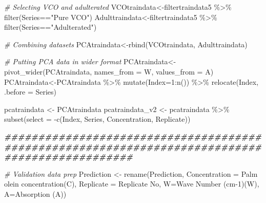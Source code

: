 \documentclass[
]{article}
\newenvironment{Shaded}{\begin{snugshade}}{\end{snugshade}}
\newcommand{\AttributeTok}[1]{\textcolor[rgb]{0.77,0.63,0.00}{#1}}
\newcommand{\CommentTok}[1]{\textcolor[rgb]{0.56,0.35,0.01}{\textit{#1}}}
\newcommand{\DecValTok}[1]{\textcolor[rgb]{0.00,0.00,0.81}{#1}}
\newcommand{\DocumentationTok}[1]{\textcolor[rgb]{0.56,0.35,0.01}{\textbf{\textit{#1}}}}
\newcommand{\FunctionTok}[1]{\textcolor[rgb]{0.00,0.00,0.00}{#1}}
\newcommand{\NormalTok}[1]{#1}
\newcommand{\OtherTok}[1]{\textcolor[rgb]{0.56,0.35,0.01}{#1}}
\newcommand{\SpecialCharTok}[1]{\textcolor[rgb]{0.00,0.00,0.00}{#1}}
\newcommand{\StringTok}[1]{\textcolor[rgb]{0.31,0.60,0.02}{#1}}
\begin{document}
\begin{Shaded}
\begin{Highlighting}[]
  \CommentTok{\# Selecting VCO and adulterated}
\NormalTok{  VCOtraindata}\OtherTok{\textless{}{-}}\NormalTok{filtertraindata5 }\SpecialCharTok{\%\textgreater{}\%} \FunctionTok{filter}\NormalTok{(Series}\SpecialCharTok{==}\StringTok{"Pure VCO"}\NormalTok{)}
\NormalTok{  Adulttraindata}\OtherTok{\textless{}{-}}\NormalTok{filtertraindata5 }\SpecialCharTok{\%\textgreater{}\%} \FunctionTok{filter}\NormalTok{(Series}\SpecialCharTok{==}\StringTok{"Adulterated"}\NormalTok{)}
  
  \CommentTok{\# Combining datasets}
\NormalTok{  PCAtraindata}\OtherTok{\textless{}{-}}\FunctionTok{rbind}\NormalTok{(VCOtraindata, Adulttraindata)}
  
  \CommentTok{\# Putting PCA data in wider format}
\NormalTok{  PCAtraindata}\OtherTok{\textless{}{-}}\FunctionTok{pivot\_wider}\NormalTok{(PCAtraindata, }\AttributeTok{names\_from =}\NormalTok{ W, }\AttributeTok{values\_from =}\NormalTok{ A)}
\NormalTok{  PCAtraindata}\OtherTok{\textless{}{-}}\NormalTok{PCAtraindata }\SpecialCharTok{\%\textgreater{}\%} \FunctionTok{mutate}\NormalTok{(}\AttributeTok{Index=}\DecValTok{1}\SpecialCharTok{:}\FunctionTok{n}\NormalTok{()) }\SpecialCharTok{\%\textgreater{}\%} \FunctionTok{relocate}\NormalTok{(Index, }\AttributeTok{.before =}\NormalTok{ Series)}
  
\NormalTok{  pcatraindata }\OtherTok{\textless{}{-}}\NormalTok{  PCAtraindata}
\NormalTok{  pcatraindata\_v2 }\OtherTok{\textless{}{-}}\NormalTok{ pcatraindata }\SpecialCharTok{\%\textgreater{}\%} \FunctionTok{subset}\NormalTok{(}\AttributeTok{select =} \SpecialCharTok{{-}}\FunctionTok{c}\NormalTok{(Index, Series, Concentration, Replicate))}

 \DocumentationTok{\#\#\#\#\#\#\#\#\#\#\#\#\#\#\#\#\#\#\#\#\#\#\#\#\#\#\#\#\#\#\#\#\#\#\#\#\#\#\#\#\#\#\#\#\#\#\#\#\#\#\#\#\#\#\#\#\#\#\#\#\#\#\#\#\#\#\#\#\#\#\#\#\#\#\#\#\#\#\#\#\#\#\#\#\#\#\#\#\#\#\#\#\#\#\#}
  
  \CommentTok{\# Validation data prep}
\NormalTok{ Prediction }\OtherTok{\textless{}{-}} \FunctionTok{rename}\NormalTok{(Prediction, }\AttributeTok{Concentration =} \StringTok{\textasciigrave{}}\AttributeTok{Palm olein concentration(C)}\StringTok{\textasciigrave{}}\NormalTok{, }
                    \AttributeTok{Replicate =} \StringTok{\textasciigrave{}}\AttributeTok{Replicate No}\StringTok{\textasciigrave{}}\NormalTok{, }\AttributeTok{W=}\StringTok{\textasciigrave{}}\AttributeTok{Wave Number (cm{-}1)(W)}\StringTok{\textasciigrave{}}\NormalTok{, }\AttributeTok{A=}\StringTok{\textasciigrave{}}\AttributeTok{Absorption (A)}\StringTok{\textasciigrave{}}\NormalTok{)}
  

\end{Highlighting}
\end{Shaded}
\end{document}
